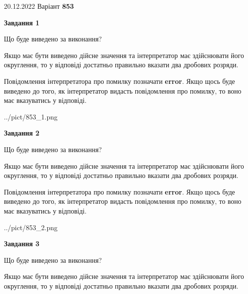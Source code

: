 \documentclass[12pt, ukrainian]{article}
\begin{document}
{20.12.2022 Варіант \No \textbf { 853 }\par}
{
\begin {Large}

{\begin {center}\textbf{Завдання 1}\end {center}}\par
Що буде виведено за виконання? \par

Якщо має бути виведено дійсне значення та інтерпретатор має здійснювати його округлення, 
то у відповіді достатньо правильно вказати два дробових розряди.

Повідомлення інтерпретатора про помилку позначати \textbf{error}.
Якщо щось буде виведено до того, як інтерпретатор видасть повідомлення про помилку, 
то воно має вказуватись у відповіді. \par

\begin{center}
	{../pict/853_1.png}
\end{center}
\newpage

{\begin {center}\textbf{Завдання 2}\end {center}}\par
Що буде виведено за виконання? \par

Якщо має бути виведено дійсне значення та інтерпретатор має здійснювати його округлення, 
то у відповіді достатньо правильно вказати два дробових розряди.

Повідомлення інтерпретатора про помилку позначати \textbf{error}.
Якщо щось буде виведено до того, як інтерпретатор видасть повідомлення про помилку, 
то воно має вказуватись у відповіді. \par

\begin{center}
	{../pict/853_2.png}
\end{center}
\newpage

{\begin {center}\textbf{Завдання 3}\end {center}}\par
Що буде виведено за виконання? \par

Якщо має бути виведено дійсне значення та інтерпретатор має здійснювати його округлення, 
то у відповіді достатньо правильно вказати два дробових розряди.


\end{Large}}
\end{document}
